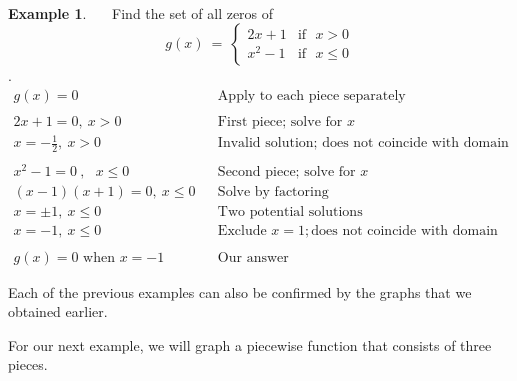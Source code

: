 \documentclass[12pt]{book}
\theoremstyle{definition}
\newtheorem{example}{Example}
\begin{document}
~\\
\begin{example}~~~Find the set of all zeros of \[ g(x)~=~
\begin{cases} 
      2x+1 & \text{if~~} x> 0\\
			x^2-1 & \text{if~~} x\leq 0
  \end{cases}
\].
\begin{eqnarray*}
	g(x)=0~~~~~ & &\text{Apply~to~each~piece~separately}\\
	&&\\
	2x+1=0,~x>0 & &\text{First~piece;~solve~for~}x\\
	x=-\frac{1}{2},~x>0 & & \text{Invalid~solution;~does~not~coincide~with~domain}\\
	& &\\
	x^2-1=0~,~~~x\leq 0 & &\text{Second~piece;~solve~for~}x\\
	(x-1)(x+1)=0,~x\leq 0 & & \text{Solve~by~factoring}\\
	x=\pm 1,~x\leq 0 & & \text{Two~potential~solutions}\\
	x=-1,~x\leq 0 & &\text{Exclude~} x=1; \text{does~not~coincide~with~domain}\\
	& &\\
	g(x)=0 \text{~when~} x=-1 & & \text{Our~answer}
\end{eqnarray*}
\end{example}
Each of the previous examples can also be confirmed by the graphs that we obtained earlier.\par
For our next example, we will graph a piecewise function that consists of three pieces.
\end{document}
